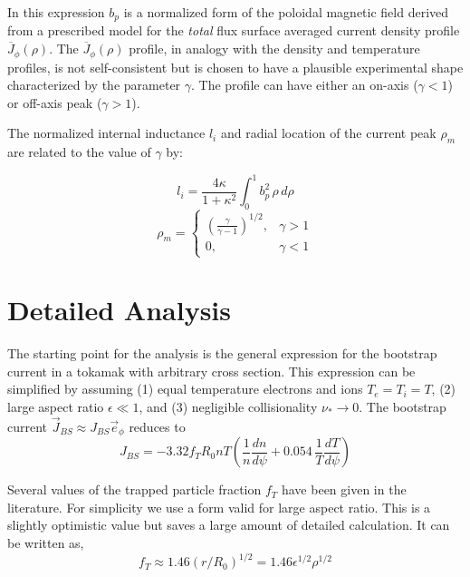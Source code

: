 In this expression $b_p$ is a normalized form of the poloidal magnetic field derived from a prescribed model for the \emph{total} flux surface averaged current density profile $\overline J_\phi(\rho)$. The $\overline J_\phi(\rho)$ profile, in analogy with the density and temperature profiles, is not self-consistent but is chosen to have a plausible experimental shape characterized by the parameter $\gamma$. The profile can have either an on-axis ($\gamma < 1$) or off-axis peak ($\gamma > 1 $).

The normalized internal inductance $l_i$ and radial location of the current peak $\rho_m$ are related to the value of $\gamma$ by:

\begin{equation}
	l_i = \frac{ 4 \kappa }{ 1 + \kappa^2 } \int_0^1 b_p^2 \, \rho \, d\rho
\end{equation}
\begin{equation}
	\rho_m = 
\begin{cases}
   \left( \frac{\gamma}{\gamma - 1} \right)^{1/2},& \gamma > 1 \\
    0,              & \gamma < 1
\end{cases}
\end{equation}

\section{Detailed Analysis}

The starting point for the analysis is the general expression for the bootstrap current in a tokamak with arbitrary cross section.\cite{wesson} This expression can be simplified by assuming (1) equal temperature electrons and ions $T_e = T_i = T$, (2) large aspect ratio $\epsilon \ll 1$, and (3) negligible collisionality $\nu_* \rightarrow 0$. The bootstrap current $\vec J_{BS} \approx J_{BS} \vec e_\phi$ reduces to
\begin{equation}
	J_{BS} = -3.32 f_T R_0 n T \left( \frac{1}{n} \frac{dn}{d\psi} + 0.054 \, \frac{1}{T} \frac{dT}{d\psi} \right)
\end{equation}

Several values of the trapped particle fraction $f_T$ have been given in the literature.\cite{kessel_bootstrap} For simplicity we use a form valid for large aspect ratio. This is a slightly optimistic value but saves a large amount of detailed calculation. It can be written as,
\begin{equation}
	f_T \approx 1.46 ( r / R_0 )^{1/2} = 1.46 \epsilon^{1/2} \rho^{1/2}
\end{equation}

